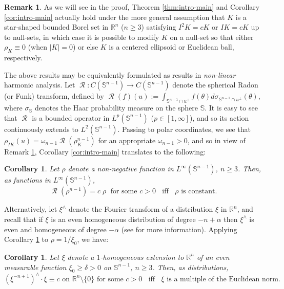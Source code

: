 \documentclass[11pt]{article}
\newtheorem{cor}[thm]{Corollary}
\theoremstyle{definition}
\newtheorem{rem}[thm]{\textbf{Remark}}
\theoremstyle{proof}
\DeclareMathOperator{\+}{\mathop{\tilde{+}}}
\DeclareMathOperator{\Rad}{\mathcal{R}}
\newcommand{\R}{\mathbb{R}}
\renewcommand{\S}{\mathbb{S}}
\numberwithin{equation}{section}
\numberwithin{equation}{section}
\begin{document}
\begin{rem} \label{rem:intro-gen}
As we will see in the proof, Theorem \ref{thm:intro-main} and Corollary \ref{cor:intro-main} actually hold under the more general assumption that $K$ is a star-shaped bounded Borel set in $\R^n$ ($n \geq 3$) satisfying $I^2 K = c K$ or $I K = c K$ up to null-sets, in which case it is possible to modify $K$ on a null-set so that either $\rho_K \equiv 0$ (when $|K| = 0$) or else $K$ is a centered ellipsoid or Euclidean ball, respectively.
\end{rem}



The above results may be equivalently formulated as results in \emph{non-linear} harmonic analysis. Let $\Rad : C(\S^{n-1}) \rightarrow C(\S^{n-1})$ denote the spherical Radon (or Funk) transform, defined by $\Rad(f)(u) := \int_{\S^{n-1} \cap u^{\perp}} f(\theta) d\sigma_{\S^{n-1} \cap u^{\perp}}(\theta)$,
where $\sigma_{\S}$ denotes the Haar probability measure on the sphere $\S$. It is easy to see that $\Rad$ is a bounded operator in $L^p(\S^{n-1})$ ($p \in [1,\infty]$), and so its action continuously extends to $L^2(\S^{n-1})$. 
Passing to polar coordinates, we see that $\rho_{IK}(u) = \omega_{n-1} \Rad(\rho_K^{n-1})$ for an appropriate $\omega_{n-1} > 0$, and so in view of Remark \ref{rem:intro-gen}, Corollary \ref{cor:intro-main} translates to the following:
\begin{cor} \label{cor:intro-Radon}
Let $\rho$ denote a non-negative function in $L^\infty(\S^{n-1})$, $n \geq 3$. 
Then, as functions in $L^\infty(\S^{n-1})$,
\[
\Rad(\rho^{n-1}) = c \; \rho \; \text{ for some $c > 0$} \;\; \text{ iff } \;\; \text{$\rho$ is constant.}
\]
\end{cor}
Alternatively, let $\xi^{\wedge}$ denote the Fourier transform of a distribution $\xi$ in $\R^n$, and recall that if $\xi$ is an even homogeneous distribution of degree $-n+\alpha$ then $\xi^{\wedge}$ is even and homogeneous of degree $-\alpha$ (see \cite[Lemma 2.21 and Theorem 3.8]{Koldobsky-Book} for more information). Applying Corollary \ref{cor:intro-Radon} to $\rho = 1 / \xi_0$, we have:
\begin{cor} \label{cor:intro-Fourier}
Let $\xi$ denote a $1$-homogeneous extension to $\R^n$ of an even measurable function $\xi_0 \geq \delta > 0$ on $\S^{n-1}$, $n \geq 3$. Then, as distributions,
\[
(\xi^{-n+1})^{\wedge} \cdot \xi \equiv c \text{ on $\R^n \setminus \{0\}$ for some $c > 0$} \;\; \text{ iff } \;\; \text{$\xi$ is a multiple of the Euclidean norm.}
\]
\end{cor}
\end{document}
